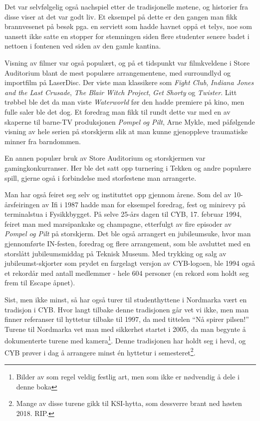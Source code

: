Det var selvfølgelig også nachspiel etter de tradisjonelle møtene, og historier fra disse viser at det var godt liv. Et eksempel på dette er den gangen man fikk brannvesenet på besøk pga. en serviett som hadde havnet oppå et telys, noe som uansett ikke satte en stopper for stemningen siden flere studenter senere badet i nettoen i fontenen ved siden av den gamle kantina.

Visning av filmer var også populært, og på et tidspunkt var filmkveldene i Store Auditorium blant de mest populære arrangementene, med surroundlyd og importfilm på LaserDisc. Der viste man klassikere som \textit{Fight Club}, \textit{Indiana Jones and the Last Crusade}, \textit{The Blair Witch Project}, \textit{Get Shorty} og \textit{Twister}. Litt trøbbel ble det da man viste \textit{Waterworld} før den hadde premiere på kino, men fulle saler ble det dog. Et foredrag man fikk til rundt dette var med en av skaperne til barne-TV produksjonen \textit{Pompel og Pilt}, Arne Mykle, med påfølgende visning av hele serien på storskjerm slik at man kunne gjenoppleve traumatiske minner fra barndommen.

En annen populær bruk av Store Auditorium og storskjermen var gamingkonkurranser. Her ble det satt opp turnering i Tekken og andre populære spill, gjerne også i forbindelse med storfestene man arrangerte.

Man har også feiret seg selv og instituttet opp gjennom årene. Som del av 10-årsfeiringen av Ifi i 1987 hadde man for eksempel foredrag, fest og minirevy på terminalstua i Fysikkbygget. På selve 25-års dagen til CYB, 17. februar 1994, feiret man med marsipankake og champagne, etterfulgt av fire episoder av \textit{Pompel og Pilt} på storskjerm. Det ble også arrangert en jubileumsuke, hvor man gjennomførte IN-festen, foredrag og flere arrangement, som ble avsluttet med en storslått jubileumsmiddag på Teknisk Museum. Med trykking og salg av jubileumst-skjorter som prydet en fargelagt versjon av CYB-logoen, ble 1994 også et rekordår med antall medlemmer - hele 604 personer (en rekord som holdt seg frem til Escape åpnet).

Sist, men ikke minst, så har også turer til studenthyttene i Nordmarka vært en tradisjon i CYB. Hvor langt tilbake denne tradisjonen går vet vi ikke, men man finner referanser til hyttetur tilbake til 1997, da med tittelen ``Nå spirer pilsen!'' Turene til Nordmarka vet man med sikkerhet startet i 2005, da man begynte å dokumenterte turene med kamera\footnote{Bilder av som regel veldig festlig art, men som ikke er nødvendig å dele i denne boka}. Denne tradisjonen har holdt seg i hevd, og CYB prøver i dag å arrangere minst én hyttetur i semesteret\footnote{Mange av disse turene gikk til KSI-hytta, som dessverre brant ned høsten 2018. RIP.}.

